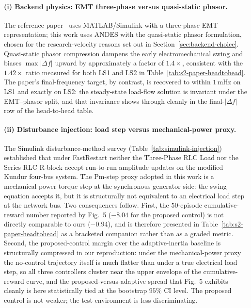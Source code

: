 \documentclass{unnc-fyp}
\begin{document}
\paragraph{(i) Backend physics: EMT three-phase versus quasi-static phasor.}
The reference paper~\cite{yang2023ddic} uses MATLAB/Simulink with a
three-phase EMT representation; this work uses ANDES with the
quasi-static phasor formulation, chosen for the research-velocity
reasons set out in Section~\ref{sec:backend-choice}. Quasi-static
phasor compression dampens the early electromechanical swing and
biases $\max|\Delta f|$ upward by approximately a factor of
$1.4\times$, consistent with the $1.42\times$ ratio measured for both
LS1 and LS2 in Table~\ref{tab:s2-paper-headtohead}. The paper's
final-frequency target, by contrast, is recovered to within $1$\,mHz
on LS1 and exactly on LS2: the steady-state load-flow solution is
invariant under the EMT--phasor split, and that invariance shows
through cleanly in the final-$|\Delta f|$ row of the head-to-head
table.

\paragraph{(ii) Disturbance injection: load step versus mechanical-power proxy.}
The Simulink disturbance-method survey
(Table~\ref{tab:simulink-injection}) established that under
FastRestart neither the Three-Phase RLC Load nor the Series RLC
R-block accept run-to-run amplitude updates on the modified Kundur
four-bus system. The Pm-step proxy adopted in this work is a
mechanical-power torque step at the synchronous-generator side: the
swing equation accepts it, but it is structurally not equivalent to
an electrical load step at the network bus. Two consequences follow.
First, the $50$-episode cumulative-reward number reported by
\cite{yang2023ddic} Fig.~5 ($-8.04$ for the proposed control) is not
directly comparable to ours ($-0.94$), and is therefore presented in
Table~\ref{tab:s2-paper-headtohead} as a bracketed companion rather
than as a graded metric.
Second, the proposed-control margin over the adaptive-inertia
baseline is structurally compressed in our reproduction: under the
mechanical-power proxy the no-control trajectory itself is much
flatter than under a true electrical load step, so all three
controllers cluster near the upper envelope of the cumulative-reward
curve, and the proposed-versus-adaptive spread that
\cite{yang2023ddic} Fig.~5 exhibits cleanly is here statistically
tied at the bootstrap $95\%$ CI level. The proposed control is not
weaker; the test environment is less discriminating.
\end{document}
